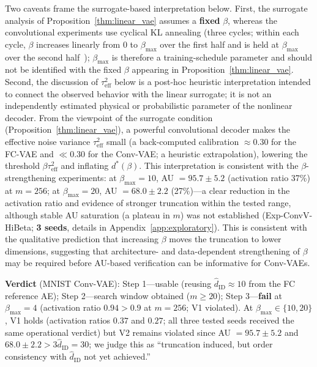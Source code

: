 \documentclass[make,article,submit,pdftex,moreauthors]{Definitions/mdpi}
\newcommand{\hatdID}{\hat{d}_{\mathrm{ID}}}
\newcommand{\dstar}{d^{*}(\beta)}
\begin{document}
Two caveats frame the surrogate-based interpretation below.
First, the surrogate analysis of Proposition~\ref{thm:linear_vae} assumes
a \textbf{fixed} $\beta$, whereas the convolutional experiments use
cyclical KL annealing (three cycles; within each cycle, $\beta$ increases
linearly from $0$ to $\beta_{\max}$ over the first half and is held at
$\beta_{\max}$ over the second half~\cite{fu2019cyclical});
$\beta_{\max}$ is therefore a training-schedule parameter and should not
be identified with the fixed $\beta$ appearing in
Proposition~\ref{thm:linear_vae}.
Second, the discussion of $\tau^2_{\mathrm{eff}}$ below is a post-hoc
heuristic interpretation intended to connect the observed behavior with
the linear surrogate; it is not an independently estimated physical or
probabilistic parameter of the nonlinear decoder.
From the viewpoint of the surrogate condition
(Proposition~\ref{thm:linear_vae}), a powerful convolutional decoder makes
the effective noise variance $\tau^2_{\mathrm{eff}}$ small (a back-computed
calibration $\approx 0.30$ for the FC-VAE and $\ll 0.30$ for the Conv-VAE; a
heuristic extrapolation), lowering the threshold
$\beta\tau^2_{\mathrm{eff}}$ and inflating $\dstar$.
This interpretation is consistent with the $\beta$-strengthening
experiments: at $\beta_{\max} = 10$, AU $= 95.7 \pm 5.2$ (activation ratio
37\%) at $m = 256$; at $\beta_{\max} = 20$, AU $= 68.0 \pm 2.2$
(27\%)---a clear reduction in the activation ratio and evidence of stronger
truncation within the tested range, although stable AU saturation (a
plateau in $m$) was not established
(Exp-ConvV-HiBeta; \textbf{3 seeds}, details in
Appendix~\ref{app:exploratory}).
This is consistent with the qualitative prediction that increasing $\beta$
moves the truncation to lower dimensions, suggesting that architecture- and
data-dependent strengthening of $\beta$ may be required before AU-based
verification can be informative for Conv-VAEs.

\textbf{Verdict} (MNIST Conv-VAE):
Step 1---usable (reusing $\hatdID \approx 10$ from the FC reference AE);
Step 2---search window obtained ($m \geq 20$);
Step 3---\textbf{fail} at $\beta_{\max} = 4$ (activation ratio
$0.94 > 0.9$ at $m = 256$; V1 violated).
At $\beta_{\max} \in \{10, 20\}$, V1 holds (activation ratios $0.37$ and
$0.27$; all three tested seeds received the same operational verdict) but V2
remains violated since AU $= 95.7 \pm 5.2$ and
$68.0 \pm 2.2 > 3\hatdID = 30$;
we judge this as ``truncation induced, but order consistency with $\hatdID$
not yet achieved.''
\end{document}
